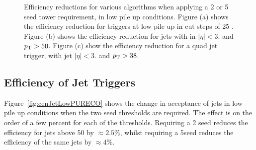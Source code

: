 \begin{figure}[h!]
    \centering
     \newline
    \caption{Efficiency reductions for various \Lone algorithms when applying a 
    2 or 5 \GeV seed tower requirement, in low pile up 
    conditions. Figure (a) shows the efficiency reduction for \HT triggers at 
    low pile up in cut steps of 25 \GeV. Figure (b) 
    shows the efficiency reduction for jets with in $|\eta| <3.$ and $p_{\mathrm{T}} > 
    50$\GeV. Figure (c) show the efficiency reduction for a quad jet trigger, 
    with jet $|\eta| <3.$ and $p_{\mathrm{T}} > 38$\GeV.}
    
    \label{fig:lowpuratereduction}
\end{figure}


\subsection{Efficiency of Jet Triggers} %
\label{sub:Efficiency of Jet Triggers}
Figure~\ref{fig:cenJetLowPURECO} shows the change in acceptance of jets in low 
pile up conditions when the two seed thresholds are required. The effect is on 
the order of a few percent for each of the thresholds. Requiring a 2 \GeV seed 
reduces the efficiency for jets above 50 \GeV by $\approx 2.5\%$, whilst 
requiring a 5\GeV seed reduces the efficiency of the same jets by $\approx 4\%$.

